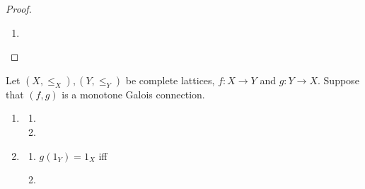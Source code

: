 \documentclass{book}
\begin{document}
\begin{proof}
\begin{enumerate}
\begin{enumerate}
\begin{itemize}
\begin{itemize}
\begin{align*}
							& \leq_Y \sup \doar y \quad \text{(by \tcr{ex on image of preimage} and \tcr{ex in section on suprema and subsets})} \\
							& = y \quad \text{(by \tcr{ex in section on suprema})} \\
							& = \id_Y(y).
						\end{align*}
						Hence $f \circ r_f \leq_Y \id_Y$. 
					\end{itemize}
					 then implies that $(f, r_f)$ is a monotone Galois connection. Thus $f$ has a right adjoint and $\rad f = r_f$. 
					\item $(\impliedby)$: \\
					Suppose that $f$ has a right adjoint and $\rad f = r_f$. Then $(f, \rad f)$ is a monotone Galois connection.  implies that for each $A \subset X$, $f(\sup A) = \sup f(A)$. Hence $f$ is arbitrary join preserving.
				\end{itemize}
				\item 
				 
			\end{enumerate}
		\end{enumerate}
	\end{proof}
	
	
	\begin{ex}
		Let $(X, \leq_X), (Y, \leq_Y)$ be complete lattices, $f:X \rightarrow Y$ and $g: Y \rightarrow X$. Suppose that $(f,g)$ is a monotone Galois connection. 
		\begin{enumerate}
			\item 
			\begin{enumerate}
				\item 
				\item 
			\end{enumerate}
			\item 
			\begin{enumerate}
				\item $g(1_Y) = 1_X$ iff
				\item 
			\end{enumerate}
		\end{enumerate}
	\end{ex}
	
\end{document}
